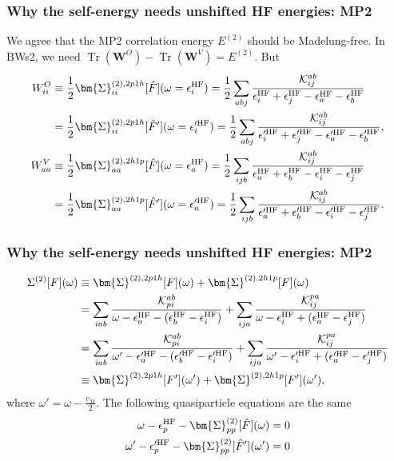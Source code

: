 \begin{frame}
\frametitle{Why the self-energy needs unshifted HF energies: MP2}
We agree that the MP2 correlation energy $E^{(2)}$ should be Madelung-free. \pause In BWs2, we need $\operatorname{Tr}(\mathbf{W}^{O}) - \operatorname{Tr}(\mathbf{W}^{V}) = E^{(2)}$. \pause But
\begin{align}
{W}^{O}_{ii} &\equiv \frac{1}{2}\bm{\Sigma}_{ii}^{(2),2p1h}[\hat F](\omega = \epsilon_i^{\rm HF}) = \frac{1}{2}\sum_{a b j} \frac{\mathcal{K}_{ij}^{ab}}{\epsilon^{\rm HF}_i + \epsilon^{\rm HF}_j - \epsilon^{\rm HF}_a - \epsilon^{\rm HF}_b}\\
&= \frac{1}{2}\bm{\Sigma}_{ii}^{(2),2p1h}[\hat F'](\omega = \epsilon'^{\rm HF}_i) =\frac{1}{2}\sum_{a b j} \frac{\mathcal{K}_{ij}^{ab}}{\epsilon'^{\rm HF}_i + \epsilon'^{\rm HF}_j - \epsilon'^{\rm HF}_a - \epsilon'^{\rm HF}_b},\\
{W}^{V}_{aa} &\equiv \frac{1}{2}\bm{\Sigma}_{aa}^{(2),2h1p}[\hat F](\omega = \epsilon^{\rm HF}_a)= \frac{1}{2}\sum_{i j b} \frac{\mathcal{K}_{ij}^{ab}}{\epsilon^{\rm HF}_a + \epsilon^{\rm HF}_b - \epsilon^{\rm HF}_i - \epsilon^{\rm HF}_j}\\
&= \frac{1}{2}\bm{\Sigma}_{aa}^{(2),2h1p}[\hat F'](\omega = \epsilon'^{\rm HF}_a) = \frac{1}{2}\sum_{i j b} \frac{\mathcal{K}_{ij}^{ab}}{\epsilon'^{\rm HF}_a + \epsilon'^{\rm HF}_b - \epsilon'^{\rm HF}_i - \epsilon'^{\rm HF}_j}.
\end{align}
\end{frame}
\begin{frame}
\frametitle{Why the self-energy needs unshifted HF energies: MP2}
\begin{align}
  \Sigma^{(2)}[F](\omega)&\equiv \bm{\Sigma}^{(2),2p1h}[F](\omega) + \bm{\Sigma}^{(2),2h1p}[F](\omega)  \\
&= \sum_{ia b} \frac{\mathcal{K}_{pi}^{ab}}{\omega - \epsilon^{\rm HF}_a - (\epsilon^{\rm HF}_b-\epsilon^{\rm HF}_i)} + \sum_{i j a} \frac{\mathcal{K}_{ij}^{pa}}{\omega-\epsilon^{\rm HF}_i + (\epsilon^{\rm HF}_a - \epsilon^{\rm HF}_j)}\\
&= \sum_{ia b} \frac{\mathcal{K}_{pi}^{ab}}{\omega' - \epsilon'^{\rm HF}_a - (\epsilon'^{\rm HF}_b-\epsilon'^{\rm HF}_i)} + \sum_{i j a} \frac{\mathcal{K}_{ij}^{pa}}{\omega'-\epsilon'^{\rm HF}_i + (\epsilon'^{\rm HF}_a - \epsilon'^{\rm HF}_j)}\label{eq:second_order_self_energy}\\
&\equiv \bm{\Sigma}^{(2),2p1h}[F'](\omega') + \bm{\Sigma}^{(2),2h1p}[F'](\omega'),
\end{align}
where $\omega' = \omega - \frac{v_M}{2}$. \pause The following quasiparticle equations are the same
\begin{align}
\omega - \epsilon^{\rm HF}_p - \bm{\Sigma}^{(2)}_{pp}[\hat F](\omega) &= 0\\
\omega' - \epsilon'^{\rm HF}_p - \bm{\Sigma}^{(2)}_{pp}[\hat F'](\omega') &= 0
\end{align} 
\end{frame}
